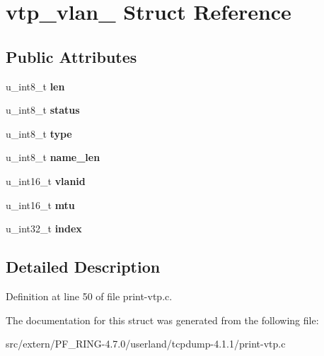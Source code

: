 \hypertarget{structvtp__vlan__}{
\section{vtp\_\-vlan\_\- Struct Reference}
\label{structvtp__vlan__}
}
\subsection*{Public Attributes}
\begin{DoxyCompactItemize}
\item 
\hypertarget{structvtp__vlan___a8d8c9c75c689a420a3ee5452fae293cb}{
u\_\-int8\_\-t {\bfseries len}}
\label{structvtp__vlan___a8d8c9c75c689a420a3ee5452fae293cb}

\item 
\hypertarget{structvtp__vlan___ad003637102a5426f6d00e8fe4f9b2cf1}{
u\_\-int8\_\-t {\bfseries status}}
\label{structvtp__vlan___ad003637102a5426f6d00e8fe4f9b2cf1}

\item 
\hypertarget{structvtp__vlan___aebcb8625c06ac86e876be557bbd47442}{
u\_\-int8\_\-t {\bfseries type}}
\label{structvtp__vlan___aebcb8625c06ac86e876be557bbd47442}

\item 
\hypertarget{structvtp__vlan___a2d879d787fcb99cdbce4ac58d7e84480}{
u\_\-int8\_\-t {\bfseries name\_\-len}}
\label{structvtp__vlan___a2d879d787fcb99cdbce4ac58d7e84480}

\item 
\hypertarget{structvtp__vlan___ab383644d0d7e031c75844ffe99dbc9f0}{
u\_\-int16\_\-t {\bfseries vlanid}}
\label{structvtp__vlan___ab383644d0d7e031c75844ffe99dbc9f0}

\item 
\hypertarget{structvtp__vlan___a9ea984b3629c5df2a72db24a6c08e71d}{
u\_\-int16\_\-t {\bfseries mtu}}
\label{structvtp__vlan___a9ea984b3629c5df2a72db24a6c08e71d}

\item 
\hypertarget{structvtp__vlan___a5cca8ddb076bfe59937eeb1a1c4726ca}{
u\_\-int32\_\-t {\bfseries index}}
\label{structvtp__vlan___a5cca8ddb076bfe59937eeb1a1c4726ca}

\end{DoxyCompactItemize}


\subsection{Detailed Description}


Definition at line 50 of file print-\/vtp.c.



The documentation for this struct was generated from the following file:\begin{DoxyCompactItemize}
\item 
src/extern/PF\_\-RING-\/4.7.0/userland/tcpdump-\/4.1.1/print-\/vtp.c\end{DoxyCompactItemize}
